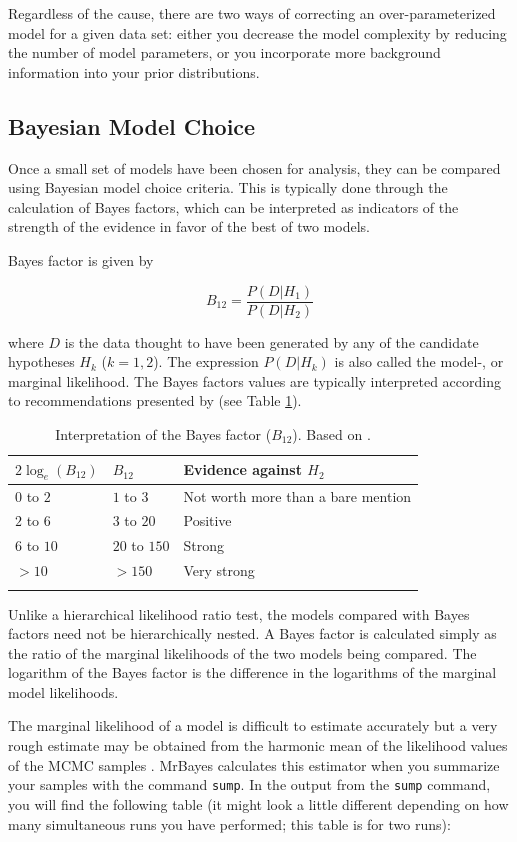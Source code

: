 \documentclass[12pt]{book}
\begin{document}
Regardless of the cause, there are two ways of correcting an over-parameterized model for a given
data set: either you decrease the model complexity by reducing the number of model parameters, or
you incorporate more background information into your prior distributions.

\subsection{Bayesian Model Choice}
\label{bayesianModelChoice}

Once a small set of models have been chosen for analysis, they can be compared using Bayesian model
choice criteria. This is typically done through the calculation of Bayes factors, which can be
interpreted as indicators of the strength of the evidence in favor of the best of two models.

Bayes factor is given by

$$
B_{12} = \frac{P(D|H_{1})}{P(D|H_{2})}
$$

where $D$ is the data thought to have been generated by any of the candidate hypotheses
$H_{k}$ ($k = 1,2$). The expression $P(D|H_{k})$ is also called the model-, or marginal
likelihood. The Bayes factors values are typically interpreted according to recommendations
presented by \citet{kass95} (see Table \ref{table:bftable}).

\begin{longtable}[h!]{@{}lll@{}}
\toprule
\(2\log_{e}(B_{12})\) & \(B_{12}\) & Evidence against
\(H_{2}\)\tabularnewline
\midrule
\endhead
\(0\) to \(2\) & \(1\) to \(3\) & Not worth more than a bare
mention\tabularnewline
\(2\) to \(6\) & \(3\) to \(20\) & Positive\tabularnewline
\(6\) to \(10\) & \(20\) to \(150\) & Strong\tabularnewline
\(>10\) & \(>150\) & Very strong\tabularnewline
\bottomrule
\caption{Interpretation of the Bayes factor ($B_{12}$). Based on \citep{kass95}.}
\label{table:bftable}
\end{longtable}

Unlike a hierarchical likelihood ratio test, the models compared with Bayes factors need not be
hierarchically nested. A Bayes factor is calculated simply as the ratio of the marginal likelihoods
of the two models being compared. The logarithm of the Bayes factor is the difference in the
logarithms of the marginal model likelihoods.

The marginal likelihood of a model is difficult to estimate accurately but a very rough estimate
may be obtained from the harmonic mean of the likelihood values of the MCMC samples
\citep{newton94}. MrBayes calculates this estimator when you summarize your samples with the
command \texttt{sump}. In the output from the \texttt{sump} command, you will find the following
table (it might look a little different depending on how many simultaneous runs you have performed;
this table is for two runs):
\end{document}
